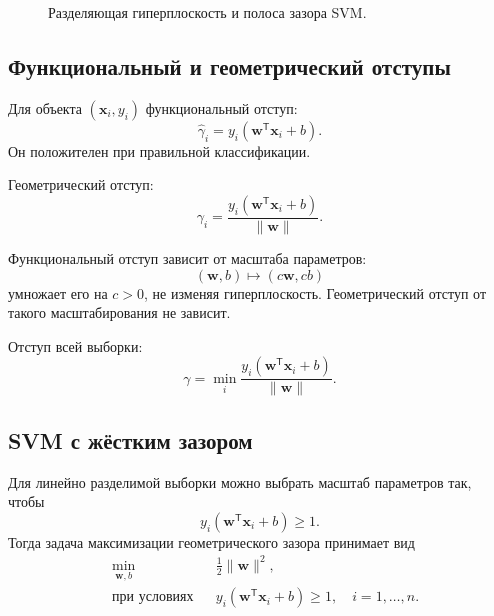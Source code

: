 \documentclass[12pt,a4paper]{article}
\theoremstyle{definition}
\newcommand{\T}{\mathsf{T}}
\newcommand{\1}{\mathbf{1}}
\begin{document}
\begin{figure}[h]
\centering
{}
\caption{Разделяющая гиперплоскость и полоса зазора SVM.}
\end{figure}

\subsection{Функциональный и геометрический отступы}

Для объекта $(\bm{x}_i,y_i)$ функциональный отступ:
\[
    \widehat{\gamma}_i
    =
    y_i(\bm{w}^{\T}\bm{x}_i+b).
\]
Он положителен при правильной классификации.

Геометрический отступ:
\[
    \gamma_i
    =
    \frac{y_i(\bm{w}^{\T}\bm{x}_i+b)}
         {\|\bm{w}\|}.
\]

Функциональный отступ зависит от масштаба параметров:
\[
    (\bm{w},b)\mapsto(c\bm{w},cb)
\]
умножает его на $c>0$, не изменяя гиперплоскость. Геометрический
отступ от такого масштабирования не зависит.

Отступ всей выборки:
\[
    \gamma
    =
    \min_i
    \frac{y_i(\bm{w}^{\T}\bm{x}_i+b)}
         {\|\bm{w}\|}.
\]

\subsection{SVM с жёстким зазором}

Для линейно разделимой выборки можно выбрать масштаб параметров так,
чтобы
\[
    y_i(\bm{w}^{\T}\bm{x}_i+b)\geq1.
\]
Тогда задача максимизации геометрического зазора принимает вид
\[
\boxed{
\begin{aligned}
    &\min_{\bm{w},b}
    &&\frac{1}{2}\|\bm{w}\|^2,\\
    &\text{при условиях}
    &&y_i(\bm{w}^{\T}\bm{x}_i+b)\geq1,
    \quad i=1,\ldots,n.
\end{aligned}
}
\]
\end{document}
